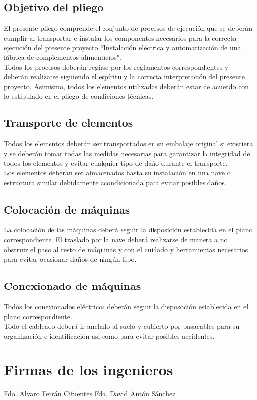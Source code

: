 \subsection{Objetivo del pliego}	
El presente pliego comprende el conjunto de procesos de ejecución que se deberán cumplir al transportar e instalar los componentes necesarios para la correcta ejecución del presente proyecto ``Instalación eléctrica y automatización de una fábrica de complementos alimenticios".
\\
Todos los procesos deberán regirse por los reglamentos correspondientes y deberán realizarse siguiendo el espíritu y la correcta interpretación del presente proyecto. Asimismo, todos los elementos utilizados deberán estar de acuerdo con lo estipulado en el pliego de condiciones técnicas.

\subsection{Transporte de elementos}
Todos los elementos deberán ser transportados en su embalaje original si existiera y se deberán tomar todas las medidas necesarias para garantizar la integridad de todos los elementos y evitar cualquier tipo de daño durante el transporte. 
\\
Los elementos deberán ser almacenados hasta su instalación en una nave o estructura similar debidamente acondicionada para evitar posibles daños.

\subsection{Colocación de máquinas}
La colocación de las máquinas deberá seguir la disposición establecida en el plano correspondiente. El traslado por la nave deberá realizarse de manera a no obstruir el paso al resto de máquinas y con el cuidado y herramientas necesarios para evitar ocasionar daños de ningún tipo. 



\subsection{Conexionado de máquinas}
Todos los conexionados eléctricos deberán seguir la disposoción establecida en el plano correspondiente.  \\
Todo el cableado deberá ir anclado al suelo y cubierto por pasacables para su organización e identificación asi como para evitar posibles accidentes.


\newpage\section {Firmas de los ingenieros}
\vspace{5cm}
Fdo. Alvaro Ferrán Cifuentes
\vspace{5cm}\hspace{5cm}
Fdo. David Antón Sánchez
